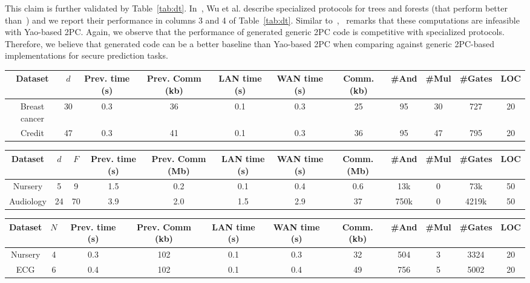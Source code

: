 This claim is further validated by Table~\ref{tab:dt}.
In~\cite{wu}, Wu et al. describe specialized protocols for trees and forests (that perform better than~\cite{shafindss}) and we report their performance in columns 3 and 4 of Table~\ref{tab:dt}.
Similar to~\cite{shafindss},~\cite{wu} remarks that these computations are infeasible with Yao-based 2PC.
Again, we observe that the performance of \tool generated generic 2PC code is competitive with specialized protocols. Therefore, we believe that \tool generated code can be a better baseline than Yao-based 2PC when comparing against generic 2PC-based implementations for secure prediction tasks.

\begin{table*}
\begin{tabular}{c|c|c|c|c |c|c|c|c|c|c}
Dataset & $d$  & Prev. time (s) & Prev. Comm (kb) & LAN time (s) & WAN time (s) & Comm. (kb)  & \#And & \#Mul & \#Gates & LOC\\
\hline
Breast cancer & 30 & 0.3 & 36 & 0.1 & 0.3 & 25 & 95 & 30 & 727 & 20\\
\hline
Credit & 47 & 0.3 & 41 & 0.1 & 0.3 & 36 & 95 & 47 & 795 & 20\\
\hline
\end{tabular}

 \caption{Linear classification results. We compare our results (columns 5, 6, 7) with~\cite{shafindss} (columns 3 and 4)}
 \label{tab:lc} 
\end{table*}

\begin{table*}
\begin{tabular}{c|c|c|c|c|c |c|c|c|c|c|c}
Dataset & $d$ & $F$ & Prev. time (s) & Prev. Comm (Mb) & LAN time (s) & WAN time (s) & Comm. (Mb)  & \#And & \#Mul & \#Gates  & LOC\\
\hline
Nursery & 5 & 9 & 1.5 & 0.2 & 0.1 & 0.4 & 0.6 & 13k & 0 & 73k & 50\\
\hline
Audiology & 24 & 70 & 3.9 & 2.0 & 1.5 & 2.9 & 37 & 750k & 0 & 4219k & 50\\
\hline
\end{tabular}

 \caption{Na\"{i}ve Bayes results. We compare our results (columns 6 , 7, 8) with~\cite{shafindss} (columns 4 and 5)}
 \label{tab:nb} 
\end{table*}

\begin{table*}
\begin{tabular}{c|c|c|c |c|c|c|c|c|c|c}
Dataset  & $N$ & Prev. time (s) & Prev. Comm (kb) & LAN time (s) & WAN time (s) & Comm. (kb)  & \#And & \#Mul & \#Gates & LOC\\
\hline
Nursery & 4 & 0.3 & 102 & 0.1 & 0.3 & 32 & 504 & 3 & 3324 & 20\\
\hline
ECG &  6 & 0.4 & 102 & 0.1 & 0.4 & 49 & 756 & 5 & 5002 & 20\\
\hline
\end{tabular}

 \caption{Decision tree benchmarks. We compare our results (columns 5 , 6, 7) with~\cite{wu} (columns 3 and 4)}
 \label{tab:dt} 
\end{table*}


